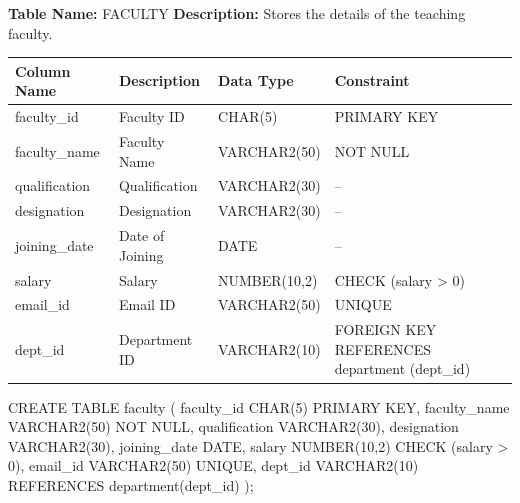 
\textbf{Table Name:} FACULTY \hspace{1em plus 1fill}
\textbf{Description:} Stores the details of the teaching faculty.

\vspace{8pt}

\renewcommand{\arraystretch}{1.4}
\begin{tabularx}{\textwidth}{|>{\raggedright\arraybackslash}X|>{\raggedright\arraybackslash}X|>{\raggedright\arraybackslash}X|>{\raggedright\arraybackslash}X|}
\hline
\textbf{Column Name} & \textbf{Description} & \textbf{Data Type} & \textbf{Constraint} \\
\hline
faculty\_id & Faculty ID & CHAR(5) & PRIMARY KEY \\
\hline
faculty\_name & Faculty Name & VARCHAR2(50) & NOT NULL \\
\hline
qualification & Qualification & VARCHAR2(30) & -- \\
\hline
designation & Designation & VARCHAR2(30) & -- \\
\hline
joining\_date & Date of Joining & DATE & -- \\
\hline
salary & Salary & NUMBER(10,2) & CHECK (salary > 0) \\
\hline
email\_id & Email ID & VARCHAR2(50) & UNIQUE \\
\hline
dept\_id & Department ID & VARCHAR2(10) & FOREIGN KEY REFERENCES department (dept\_id) \\
\hline
\end{tabularx}

\vspace{14pt}


\begin{sqlcode}
CREATE TABLE faculty (
    faculty_id    CHAR(5)       PRIMARY KEY,
    faculty_name  VARCHAR2(50)  NOT NULL,
    qualification VARCHAR2(30),
    designation   VARCHAR2(30),
    joining_date  DATE,
    salary        NUMBER(10,2)  CHECK (salary > 0),
    email_id      VARCHAR2(50)  UNIQUE,
    dept_id       VARCHAR2(10)  REFERENCES department(dept_id)
);
\end{sqlcode}

\vspace{16pt}


